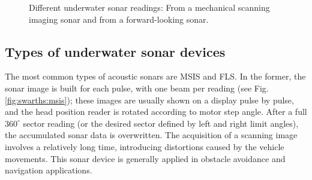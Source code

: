 \documentclass[final,5p,times]{elsarticle}
\begin{document}
\begin{figure}[t]
    \centering
    \captionsetup{justification=centering}
    \caption{Different underwater sonar readings:  From a mechanical scanning imaging sonar and  from a forward-looking sonar.}
    \label{fig:sonar_devices}
\end{figure}

\subsection{Types of underwater sonar devices}
\label{sonar:devices}

The most common types of acoustic sonars are MSIS and FLS. In the former, the sonar image is built for each pulse, with one beam per reading (see Fig. \ref{fig:swarths:msis}); these images are usually shown on a display pulse by pulse, and the head position reader is rotated according to motor step angle. After a full $360^{\circ}$ sector reading (or the desired sector defined by left and right limit angles), the accumulated sonar data is overwritten. The acquisition of a scanning image involves a relatively long time, introducing distortions caused by the vehicle movements. This sonar device is generally applied in obstacle avoidance \cite{ganesan2015} and navigation \cite{ribas2010} applications.
\end{document}
